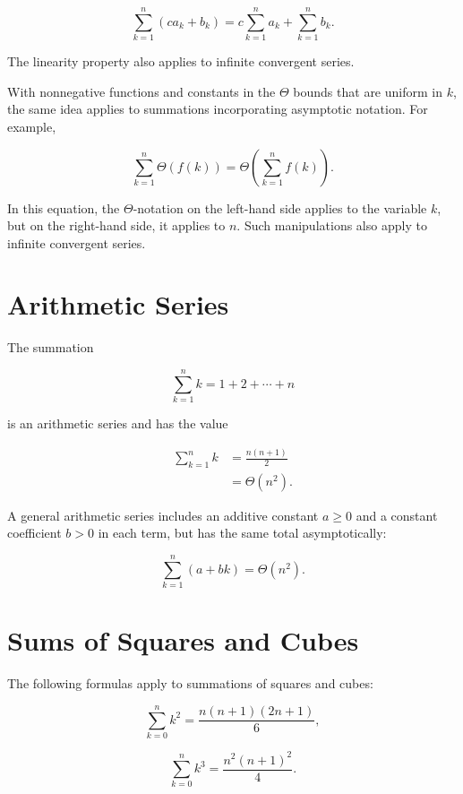 \[
    \sum_{k=1}^n\left(c a_k+b_k\right)=c \sum_{k=1}^n a_k+\sum_{k=1}^n b_k .
\]

The linearity property also applies to infinite convergent series.

With nonnegative functions and constants in the $\Theta$ bounds that are uniform in $k$, the same idea applies to summations incorporating asymptotic notation. For example,

\[
    \sum_{k=1}^n \Theta(f(k))=\Theta\left(\sum_{k=1}^n f(k)\right) .
\]

In this equation, the $\Theta$-notation on the left-hand side applies to the variable $k$, but on the right-hand side, it applies to $n$. Such manipulations also apply to infinite convergent series.

\section*{Arithmetic Series}
The summation


\[
        \sum_{k=1}^n k=1+2+\cdots+n \label{eq:arithmetic-series}
\]

is an arithmetic series and has the value


\begin{align}
    \sum_{k=1}^n k & =\frac{n(n+1)}{2} \label{eq:sum-of-natural-numbers}  \\
    & =\Theta\left(n^2\right) . \label{eq:arithmetic-series-asymptotic}
\end{align}

A general arithmetic series includes an additive constant $a \geq 0$ and a constant coefficient $b>0$ in each term, but has the same total asymptotically:

\begin{equation}
    \sum_{k=1}^n(a+b k)=\Theta\left(n^2\right) . \label{eq:general-arithmetic-series}
    \end{equation}

\section*{Sums of Squares and Cubes}
The following formulas apply to summations of squares and cubes:

    \begin{equation}
    \sum_{k=0}^n k^2=\frac{n(n+1)(2 n+1)}{6}, \label{eq:sum-of-squares}
    \end{equation}

    \begin{equation}
        \sum_{k=0}^n k^3=\frac{n^2(n+1)^2}{4} . \label{eq:sum-of-cubes}
        \end{equation}

